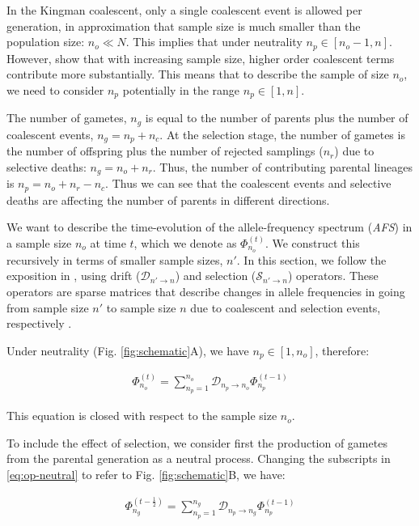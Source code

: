 \documentclass[review]{elsarticle}
\newcommand{\ra}{\rightarrow}
\newcommand{\afs}[2]{\Phi_{#1}^{(#2)}}
\begin{document}
In the Kingman coalescent, only a single coalescent event is allowed per generation, in
approximation that sample size is much smaller than the population size: $n_o \ll N$. This implies
that under neutrality $n_p \in [n_o-1, n]$. However, \citet{BhaskarEtAl2014} show that with
increasing sample size, higher order coalescent terms contribute more substantially. This means that
to describe the sample of size $n_o$, we need to consider $n_p$ potentially in the range
$n_p \in [1, n]$.

The number of gametes, $n_g$ is equal to the number of parents plus the number of coalescent events,
$n_g=n_p+n_c$. At the selection stage, the number of gametes is the number of offspring plus the
number of rejected samplings ($n_r$) due to selective deaths: $n_g = n_o+n_r$. Thus, the number of
contributing parental lineages is $n_p = n_o+n_r-n_c$. Thus we can see that the coalescent events
and selective deaths are affecting the number of parents in different directions.

We want to describe the time-evolution of the allele-frequency spectrum (\textit{AFS}) in a sample
size $n_o$ at time $t$, which we denote as $\afs{n_o}{t}$. We construct this recursively in terms of
smaller sample sizes, $n'$. In this section, we follow the exposition in \citet{JouganousEtAl2017},
using drift ($\mathcal{D}_{n' \ra n}$) and selection ($\mathcal{S}_{n' \ra n}$) operators. These
operators are sparse matrices that describe changes in allele frequencies in going from sample size
$n'$ to sample size $n$ due to coalescent and selection events, respectively \citep{JouganousEtAl2017}.

Under neutrality (Fig. \ref{fig:schematic}A), we have $n_p \in [1, n_o]$, therefore:

\begin{align}
  \label{eq:op-neutral}
  \afs{n_o}{t} = \sum_{n_p=1}^{n_o}\mathcal{D}_{n_p\ra n_o} \afs{n_p}{t-1}
\end{align}

This equation is closed with respect to the sample size $n_o$. 

To include the effect of selection, we consider first the production of gametes from the parental
generation as a neutral process. Changing the subscripts in \eqref{eq:op-neutral} to refer to Fig.
\ref{fig:schematic}B, we have:

\begin{align*}
  \afs{n_g}{t-\frac{1}{2}} = \sum_{n_p=1}^{n_g}\mathcal{D}_{n_p\ra n_g} \afs{n_p}{t-1}
\end{align*}
\end{document}
